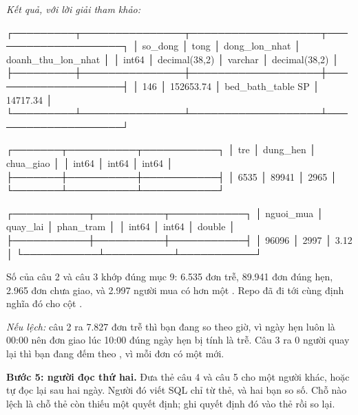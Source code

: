 \textit{Kết quả, với lời giải tham khảo:}
\begin{codeblock}
┌─────────┬───────────────┬───────────────────┬────────────────────┐
│ so_dong │     tong      │   dong_lon_nhat   │ doanh_thu_lon_nhat │
│  int64  │ decimal(38,2) │      varchar      │   decimal(38,2)    │
├─────────┼───────────────┼───────────────────┼────────────────────┤
│     146 │     152653.74 │ bed_bath_table SP │           14717.34 │
└─────────┴───────────────┴───────────────────┴────────────────────┘

┌───────┬──────────┬───────────┐
│  tre  │ dung_hen │ chua_giao │
│ int64 │  int64   │   int64   │
├───────┼──────────┼───────────┤
│  6535 │    89941 │      2965 │
└───────┴──────────┴───────────┘

┌───────────┬──────────┬───────────┐
│ nguoi_mua │ quay_lai │ phan_tram │
│   int64   │  int64   │  double   │
├───────────┼──────────┼───────────┤
│     96096 │     2997 │      3.12 │
└───────────┴──────────┴───────────┘
\end{codeblock}

Số của câu 2 và câu 3 khớp đúng  mục 9: 6.535 đơn trễ, 89.941 đơn đúng hẹn, 2.965 đơn chưa giao, và 2.997 người mua có hơn một . Repo đã đi tới cùng định nghĩa đó cho cột .

\textit{Nếu lệch:} câu 2 ra 7.827 đơn trễ thì bạn đang so theo giờ, vì ngày hẹn luôn là 00:00 nên đơn giao lúc 10:00 đúng ngày hẹn bị tính là trễ. Câu 3 ra 0 người quay lại thì bạn đang đếm theo , vì mỗi đơn có một  mới.

\textbf{Bước 5: người đọc thứ hai.} Đưa thẻ câu 4 và câu 5 cho một người khác, hoặc tự đọc lại sau hai ngày. Người đó viết SQL chỉ từ thẻ, và hai bạn so số. Chỗ nào lệch là chỗ thẻ còn thiếu một quyết định; ghi quyết định đó vào thẻ rồi so lại.


